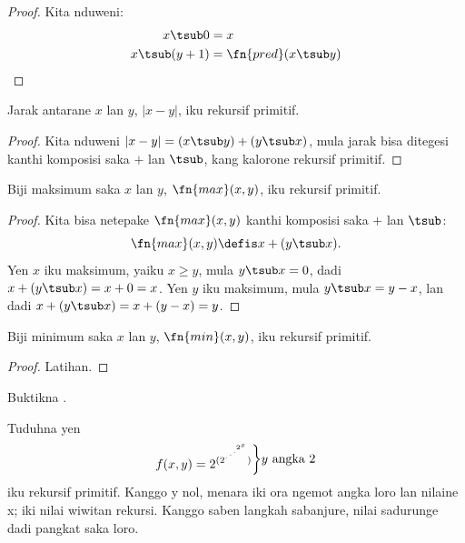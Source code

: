 \documentclass[../../../include/open-logic-section]{subfiles}
\begin{document}
\begin{proof}
  Kita nduweni:
  \begin{align*}
    x \tsub 0 & = x\\
    x \tsub (y+1) & = \fn{pred}(x \tsub y)
  \end{align*}
\end{proof}

\begin{prop}
  Jarak antarane $x$ lan $y$, $\left|x-y\right|$, iku rekursif primitif.
\end{prop}

\begin{proof}
  Kita nduweni $\left| x-y \right| = (x \tsub y) + (y \tsub x)$,
  mula jarak bisa ditegesi kanthi komposisi saka $+$ lan $\tsub$,
  kang kalorone rekursif primitif.
\end{proof}

\begin{prop}
  Biji maksimum saka $x$ lan $y$, $\fn{max}(x,y)$, iku rekursif primitif.
\end{prop}

\begin{proof}
  Kita bisa netepake $\fn{max}(x,y)$ kanthi komposisi saka $+$ lan $\tsub$:
  \[
  \fn{max}(x,y) \defis x + (y \tsub x).
  \]
  Yen $x$ iku maksimum, yaiku $x \ge y$, mula $y \tsub x = 0$,
  dadi $x + (y \tsub x) = x + 0 = x$. Yen $y$ iku maksimum,
  mula $y \tsub x = y - x$, lan dadi
  $x + (y \tsub x) = x + (y - x) = y$.
\end{proof}

\begin{prop}
  Biji minimum saka $x$ lan $y$, $\fn{min}(x,y)$, iku rekursif primitif.
\end{prop}

\begin{proof}
  Latihan.
\end{proof}

\begin{prob}
  Buktikna .
\end{prob}

\begin{prob}
Tuduhna yen \[
f(x, y) =
2^{(2^{\iddots^{2^{x}}})}\raisebox{1ex}{\bigg\rbrace}
\raisebox{1ex}{\text {$y$ angka $2$}}\] iku rekursif primitif. Kanggo y nol, menara iki ora ngemot angka loro lan nilaine x; iki nilai wiwitan rekursi. Kanggo saben langkah sabanjure, nilai sadurunge dadi pangkat saka loro.
\end{prob}
\end{document}

